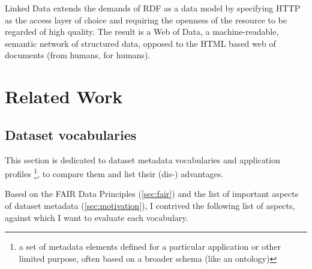 \documentclass[a4paper,english,twoside,BCOR1.5cm,headsepline,DIV12,appendixprefix,final,12pt]{scrbook}
\begin{document}
Linked Data extends the demands of RDF as a data model by specifying HTTP as the access
layer of choice and requiring the openness of the resource to be regarded of high quality. 
The result is a Web of Data, a machine-readable, semantic network of structured data, 
opposed to the HTML based web of documents (from humans, for humans).

\chapter{Related Work}
\label{chap:relatedwork}

\section{Dataset vocabularies}
\label{sec:dv}
This section is dedicated to dataset metadata vocabularies and application profiles \footnote{a set of metadata elements defined for a particular application or other limited purpose, often based on a broader schema (like an ontology)}, to compare them and list their (dis-) advantages.

Based on the FAIR Data Principles (\cref{sec:fair}) and the list of important aspects of dataset metadata (\cref{sec:motivation}), I contrived the following list of aspects, against which I want to evaluate each vocabulary.
\end{document}
